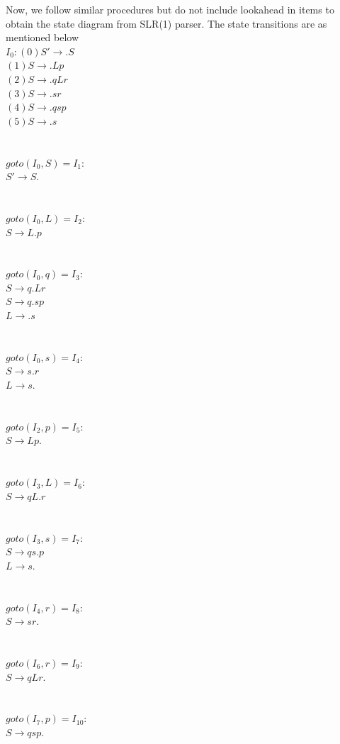 \documentclass[10pt]{letter}
\begin{document}
\begin{enumerate}
Now, we follow similar procedures but do not include lookahead in items to obtain the state diagram from SLR(1) parser. The state transitions are as mentioned below\\
$I_{0}: (0) S' \rightarrow .S  $\\
$(1) S \rightarrow .Lp$\\
$(2) S \rightarrow .qLr $\\
$(3) S \rightarrow .sr $\\
$(4) S \rightarrow .qsp $\\
$(5) S \rightarrow .s$\\
\\
\\
$goto(I_{0},S)=I_{1}:$\\
$S' \rightarrow S. $\\
\\
\\
$goto(I_{0},L)=I_{2}:$\\
$S \rightarrow L.p$\\
\\
\\
$goto(I_{0},q)=I_{3}:$\\
$S \rightarrow q.Lr$\\
$S \rightarrow q.sp$\\
$L \rightarrow .s$\\
\\
\\
$goto(I_{0},s)=I_{4}:$\\
$S \rightarrow s.r$\\
$L \rightarrow s. $\\
\\
\\
$goto(I_{2},p)=I_{5}:$\\
$S \rightarrow Lp.$\\
\\
\\
$goto(I_{3},L)=I_{6}:$\\
$S \rightarrow qL.r$\\
\\
\\
$goto(I_{3},s)=I_{7}:$\\
$S \rightarrow qs.p$\\
$L \rightarrow s.$\\
\\
\\
$goto(I_{4},r)=I_{8}:$\\
$S \rightarrow sr.$\\
\\
\\
$goto(I_{6},r)=I_{9}:$\\
$S \rightarrow qLr.$\\
\\
\\
$goto(I_{7},p)=I_{10}:$\\
$S \rightarrow qsp.$\\


\end{enumerate}
\end{document}
